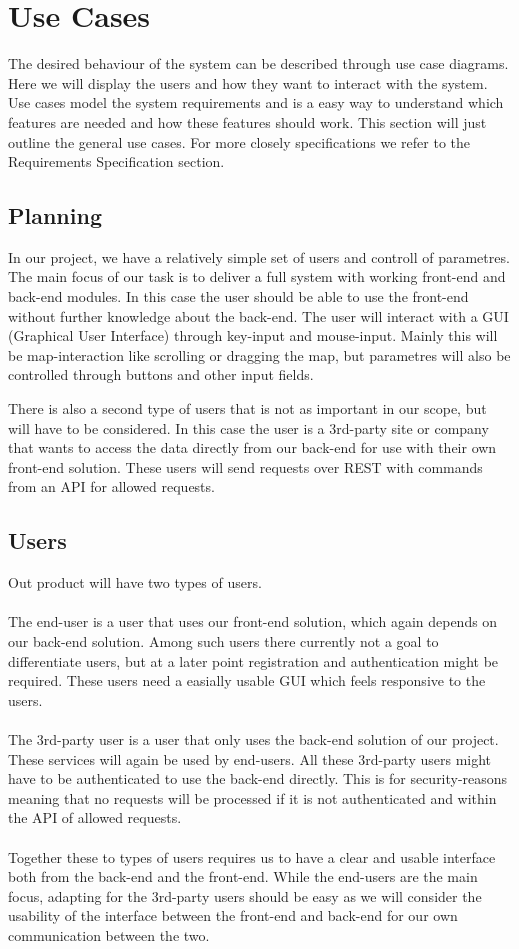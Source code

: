 \documentclass[11pt,a4paper,titlepage,oneside]{report}
\begin{document}
\section{Use Cases}
The desired behaviour of the system can be described through use case diagrams. Here we will display the users and how they want to interact with the system. Use cases model the system requirements and is a easy way to understand which features are needed and how these features should work. This section will just outline the general use cases. For more closely specifications we refer to the Requirements Specification section. %

  \subsection{Planning}
  In our project, we have a relatively simple set of users and controll of parametres. The main focus of our task is to deliver a full system with working front-end and back-end modules. In this case the user should be able to use the front-end without further knowledge about the back-end. The user will interact with a GUI (Graphical User Interface) through key-input and mouse-input. Mainly this will be map-interaction like scrolling or dragging the map, but parametres will also be controlled through buttons and other input fields.

  There is also a second type of users that is not as important in our scope, but will have to be considered. In this case the user is a 3rd-party site or company that wants to access the data directly from our back-end for use with their own front-end solution. These users will send requests over REST with commands from an API for allowed requests.

  \subsection{Users}
  Out product will have two types of users.
  \\ \\
  The end-user is a user that uses our front-end solution, which again depends on our back-end solution. Among such users there currently not a goal to differentiate users, but at a later point registration and authentication might be required. These users need a easially usable GUI which feels responsive to the users.
  \\ \\
  The 3rd-party user is a user that only uses the back-end solution of our project. These services will again be used by end-users. All these 3rd-party users might have to be authenticated to use the back-end directly. This is for security-reasons meaning that no requests will be processed if it is not authenticated and within the API of allowed requests.
  \\ \\
  Together these to types of users requires us to have a clear and usable interface both from the back-end and the front-end. While the end-users are the main focus, adapting for the 3rd-party users should be easy as we will consider the usability of the interface between the front-end and back-end for our own communication between the two.
\end{document}
